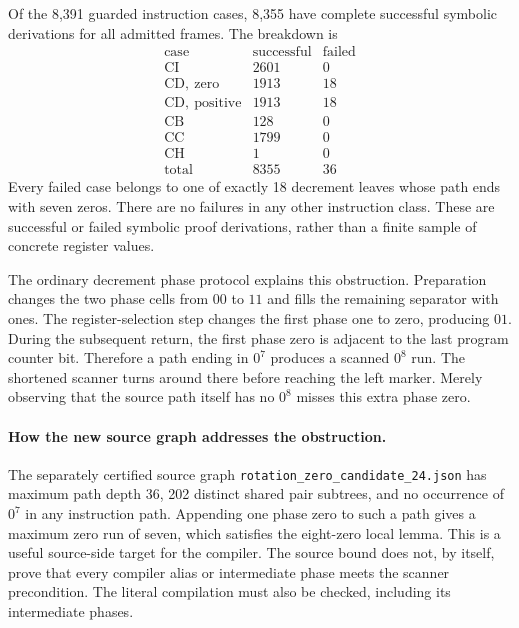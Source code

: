 Of the 8,391 guarded instruction cases, 8,355 have complete successful
symbolic derivations for all admitted frames.  The breakdown is
\[
\begin{array}{c|r|r}
 \text{case}&\text{successful}&\text{failed}\\\hline
 \mathrm{CI}&2601&0\\
 \mathrm{CD},\ \text{zero}&1913&18\\
 \mathrm{CD},\ \text{positive}&1913&18\\
 \mathrm{CB}&128&0\\
 \mathrm{CC}&1799&0\\
 \mathrm{CH}&1&0\\\hline
 \text{total}&8355&36
\end{array}
\]
Every failed case belongs to one of exactly 18 decrement leaves whose
path ends with seven zeros.  There are no failures in any other
instruction class.  These are successful or failed symbolic proof
derivations, rather than a finite sample of concrete register values.

The ordinary decrement phase protocol explains this obstruction.
Preparation changes the two phase cells from $00$ to $11$ and fills
the remaining separator with ones.  The register-selection step
changes the first phase one to zero, producing $01$.  During the
subsequent return, the first phase zero is adjacent to the last program
counter bit.  Therefore a path ending in $0^7$ produces a scanned
$0^8$ run.  The shortened scanner turns around there before reaching
the left marker.  Merely observing that the source path itself has no
$0^8$ misses this extra phase zero.

\paragraph{How the new source graph addresses the obstruction.}
The separately certified source graph
\texttt{rotation\_zero\_candidate\_24.json} has maximum path depth 36,
202 distinct shared pair subtrees, and no occurrence of $0^7$ in any
instruction path.  Appending one phase zero to such a path gives a
maximum zero run of seven, which satisfies the eight-zero local lemma.
This is a useful source-side target for the compiler.  The source bound
does not, by itself, prove that every compiler alias or intermediate
phase meets the scanner precondition.  The literal compilation must
also be checked, including its intermediate phases.


